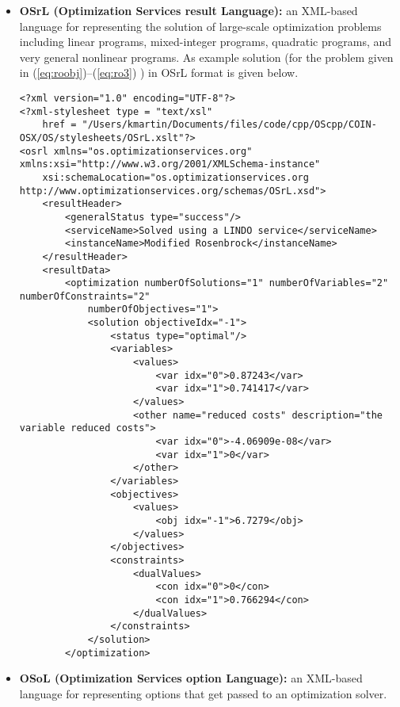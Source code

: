 \documentclass[11pt]{article}
\renewcommand{\_}{{\char"5F}}
\renewcommand{\{}{{\char"7B}}
\renewcommand{\}}{{\char"7D}}
\renewcommand{\^}{{\char"0D}}
\renewcommand{\'}{{\char"0D}}
\begin{document}
\begin{itemize}
\item[] {\bf OSrL (Optimization Services result Language):}  an
XML-based language for representing the solution of large-scale
optimization problems including linear programs, mixed-integer programs,
quadratic programs, and very general nonlinear programs.  As example solution (for the problem given in (\ref{eq:roobj})--(\ref{eq:ro3}) ) in OSrL format is given below. 

\begin{verbatim}
<?xml version="1.0" encoding="UTF-8"?>
<?xml-stylesheet type = "text/xsl" 
    href = "/Users/kmartin/Documents/files/code/cpp/OScpp/COIN-OSX/OS/stylesheets/OSrL.xslt"?>
<osrl xmlns="os.optimizationservices.org" xmlns:xsi="http://www.w3.org/2001/XMLSchema-instance"
    xsi:schemaLocation="os.optimizationservices.org http://www.optimizationservices.org/schemas/OSrL.xsd">
    <resultHeader>
        <generalStatus type="success"/>
        <serviceName>Solved using a LINDO service</serviceName>
        <instanceName>Modified Rosenbrock</instanceName>
    </resultHeader>
    <resultData>
        <optimization numberOfSolutions="1" numberOfVariables="2" numberOfConstraints="2"
            numberOfObjectives="1">
            <solution objectiveIdx="-1">
                <status type="optimal"/>
                <variables>
                    <values>
                        <var idx="0">0.87243</var>
                        <var idx="1">0.741417</var>
                    </values>
                    <other name="reduced costs" description="the variable reduced costs">
                        <var idx="0">-4.06909e-08</var>
                        <var idx="1">0</var>
                    </other>
                </variables>
                <objectives>
                    <values>
                        <obj idx="-1">6.7279</obj>
                    </values>
                </objectives>
                <constraints>
                    <dualValues>
                        <con idx="0">0</con>
                        <con idx="1">0.766294</con>
                    </dualValues>
                </constraints>
            </solution>
        </optimization>

\end{verbatim}




\item[] {\bf OSoL (Optimization Services option Language):}  an
XML-based language for representing options that get passed to an optimization solver. 


\end{itemize}
\end{document}
